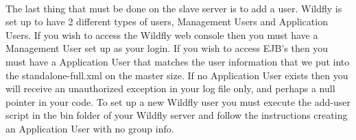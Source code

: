 \documentclass[
10pt, %
letterpaper, %
oneside, %
headinclude,footinclude, %
BCOR5mm, %
]{scrartcl}
\begin{document}
\paragraph{} The last thing that must be done on the slave server is to add a user. Wildfly is set up to have 2 different types of users, Management Users and Application Users. If you wish to access the Wildfly web console then you must have a Management User set up as your login. If you wish to access EJB's then you must have a Application User that matches the user information that we put into the standalone-full.xml on the master size. If no Application User exists then you will receive an unauthorized exception in your log file only, and perhaps a null pointer in your code. To set up a new Wildfly user you must execute the add-user script in the bin folder of your Wildfly server and follow the instructions creating an Application User with no group info.
\end{document}
